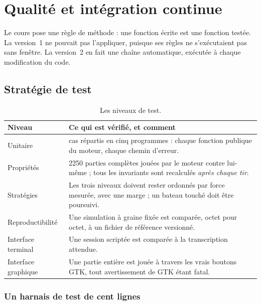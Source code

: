 \chapter{Qualité et intégration continue}
\label{chap-qualite}

Le cours pose une règle de méthode : une fonction écrite est une fonction testée. La
version~1 ne pouvait pas l'appliquer, puisque ses règles ne s'exécutaient pas sans fenêtre.
La version~2 en fait une chaîne automatique, exécutée à chaque modification du code.

\section{Stratégie de test}

\begin{table}[ht]
  \centering
  \small
  \begin{tabularx}{\textwidth}{@{}l>{\raggedright\arraybackslash}X@{}}
    \toprule
    \textbf{Niveau} & \textbf{Ce qui est vérifié, et comment} \\
    \midrule
    Unitaire & 54 cas répartis en cinq programmes : chaque fonction publique du moteur,
               chaque chemin d'erreur. \\
    \addlinespace
    Propriétés & \num{2250} parties complètes jouées par le moteur contre lui-même ; tous
                 les invariants sont recalculés \emph{après chaque tir}. \\
    \addlinespace
    Stratégies & Les trois niveaux doivent rester ordonnés par force mesurée, avec une
                 marge ; un bateau touché doit être poursuivi. \\
    \addlinespace
    Reproductibilité & Une simulation à graine fixée est comparée, octet pour octet, à un
                       fichier de référence versionné. \\
    \addlinespace
    Interface terminal & Une session scriptée est comparée à la transcription attendue. \\
    \addlinespace
    Interface graphique & Une partie entière est jouée à travers les vrais boutons GTK,
                          tout avertissement de GTK étant fatal. \\
    \bottomrule
  \end{tabularx}
  \caption{Les niveaux de test.}
  \label{tab-tests}
\end{table}

\subsection{Un harnais de test de cent lignes}

